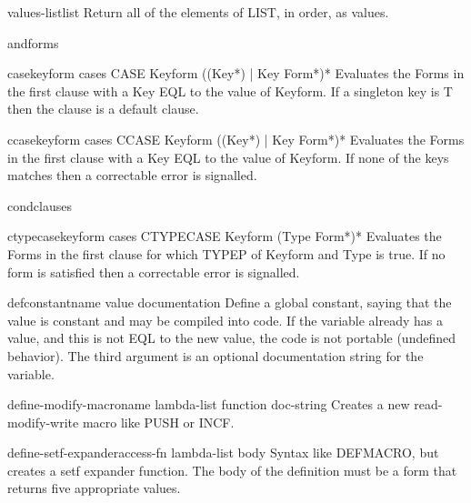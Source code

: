 \begin{function}{values-list}{list}{}{}
  Return all of the elements of LIST, in order, as values.
\end{function}

\begin{macro}{and}{\rest forms}{}{}
  
\end{macro}

\begin{macro}{case}{keyform \body cases}{}{}
  CASE Keyform {({(Key*) | Key} Form*)}*
  Evaluates the Forms in the first clause with a Key EQL to the value of
  Keyform. If a singleton key is T then the clause is a default clause.
\end{macro}

\begin{macro}{ccase}{keyform \body cases}{}{}
  CCASE Keyform {({(Key*) | Key} Form*)}*
  Evaluates the Forms in the first clause with a Key EQL to the value of
  Keyform. If none of the keys matches then a correctable error is
  signalled.
\end{macro}

\begin{macro}{cond}{\rest clauses}{}{}
  
\end{macro}

\begin{macro}{ctypecase}{keyform \body cases}{}{}
  CTYPECASE Keyform {(Type Form*)}*
  Evaluates the Forms in the first clause for which TYPEP of Keyform and Type
  is true. If no form is satisfied then a correctable error is signalled.
\end{macro}

\begin{macro}{defconstant}{name value \op documentation}{}{}
  Define a global constant, saying that the value is constant and may be
  compiled into code. If the variable already has a value, and this is not
  EQL to the new value, the code is not portable (undefined behavior). The
  third argument is an optional documentation string for the variable.
\end{macro}

\begin{macro}{define-modify-macro}{name lambda-list function \op doc-string}{}{}
  Creates a new read-modify-write macro like PUSH or INCF.
\end{macro}

\begin{macro}{define-setf-expander}{access-fn lambda-list \body body}{}{}
  Syntax like DEFMACRO, but creates a setf expander function. The body
  of the definition must be a form that returns five appropriate values.
\end{macro}

